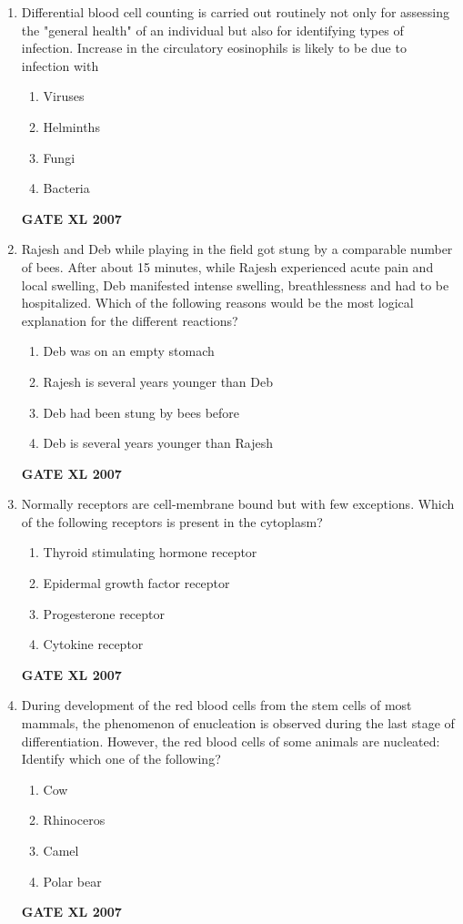 \documentclass[journal,12pt,onecolumn]{IEEEtran}
\begin{document}
\begin{enumerate}
\item Differential blood cell counting is carried out routinely not only for assessing the "general health" of an individual but also for identifying types of infection. Increase in the circulatory eosinophils is likely to be due to infection with
\begin{enumerate}
    \item Viruses
    \item Helminths
    \item Fungi
    \item Bacteria
\end{enumerate}\hfill{\textbf{GATE XL 2007}}

\item Rajesh and Deb while playing in the field got stung by a comparable number of bees. After about 15 minutes, while Rajesh experienced acute pain and local swelling, Deb manifested intense swelling, breathlessness and had to be hospitalized. Which of the following reasons would be the most logical explanation for the different reactions?
\begin{enumerate}
    \item Deb was on an empty stomach
    \item Rajesh is several years younger than Deb
    \item Deb had been stung by bees before
    \item Deb is several years younger than Rajesh
\end{enumerate}\hfill{\textbf{GATE XL 2007}}

\item Normally receptors are cell-membrane bound but with few exceptions. Which of the following receptors is present in the cytoplasm?
\begin{enumerate}
    \item Thyroid stimulating hormone receptor
    \item Epidermal growth factor receptor
    \item Progesterone receptor
    \item Cytokine receptor
\end{enumerate}\hfill{\textbf{GATE XL 2007}}

\vspace{2em}

\item During development of the red blood cells from the stem cells of most mammals, the phenomenon of enucleation is observed during the last stage of differentiation. However, the red blood cells of some animals are nucleated: Identify which one of the following?
\begin{enumerate}
    \item Cow
    \item Rhinoceros
    \item Camel
    \item Polar bear
\end{enumerate}\hfill{\textbf{GATE XL 2007}}


\end{enumerate}
\end{document}
